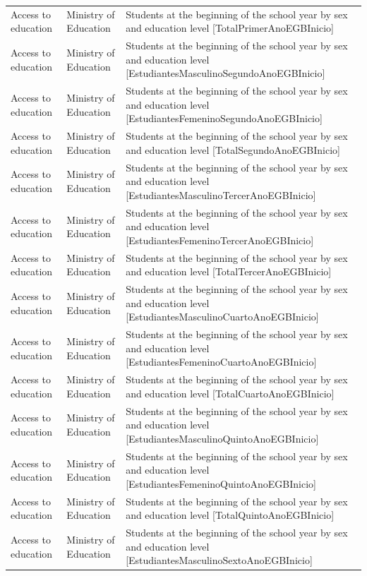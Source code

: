 \documentclass[10pt,a4paper]{article}
\begin{document}
\begin{longtable}{@{}>{\raggedright\arraybackslash}p{3.5cm}>{\raggedright\arraybackslash}p{5.6cm}>{\raggedright\arraybackslash}p{\dimexpr\textwidth-9.1cm-4\tabcolsep\relax}@{}}
Access to education & Ministry of Education & Students at the beginning of the school year by sex and education level [TotalPrimerAnoEGBInicio]\\
Access to education & Ministry of Education & Students at the beginning of the school year by sex and education level [EstudiantesMasculinoSegundoAnoEGBInicio]\\
Access to education & Ministry of Education & Students at the beginning of the school year by sex and education level [EstudiantesFemeninoSegundoAnoEGBInicio]\\
Access to education & Ministry of Education & Students at the beginning of the school year by sex and education level [TotalSegundoAnoEGBInicio]\\
Access to education & Ministry of Education & Students at the beginning of the school year by sex and education level [EstudiantesMasculinoTercerAnoEGBInicio]\\
Access to education & Ministry of Education & Students at the beginning of the school year by sex and education level [EstudiantesFemeninoTercerAnoEGBInicio]\\
Access to education & Ministry of Education & Students at the beginning of the school year by sex and education level [TotalTercerAnoEGBInicio]\\
Access to education & Ministry of Education & Students at the beginning of the school year by sex and education level [EstudiantesMasculinoCuartoAnoEGBInicio]\\
Access to education & Ministry of Education & Students at the beginning of the school year by sex and education level [EstudiantesFemeninoCuartoAnoEGBInicio]\\
Access to education & Ministry of Education & Students at the beginning of the school year by sex and education level [TotalCuartoAnoEGBInicio]\\
Access to education & Ministry of Education & Students at the beginning of the school year by sex and education level [EstudiantesMasculinoQuintoAnoEGBInicio]\\
Access to education & Ministry of Education & Students at the beginning of the school year by sex and education level [EstudiantesFemeninoQuintoAnoEGBInicio]\\
Access to education & Ministry of Education & Students at the beginning of the school year by sex and education level [TotalQuintoAnoEGBInicio]\\
Access to education & Ministry of Education & Students at the beginning of the school year by sex and education level [EstudiantesMasculinoSextoAnoEGBInicio]\\

\end{longtable}
\end{document}
